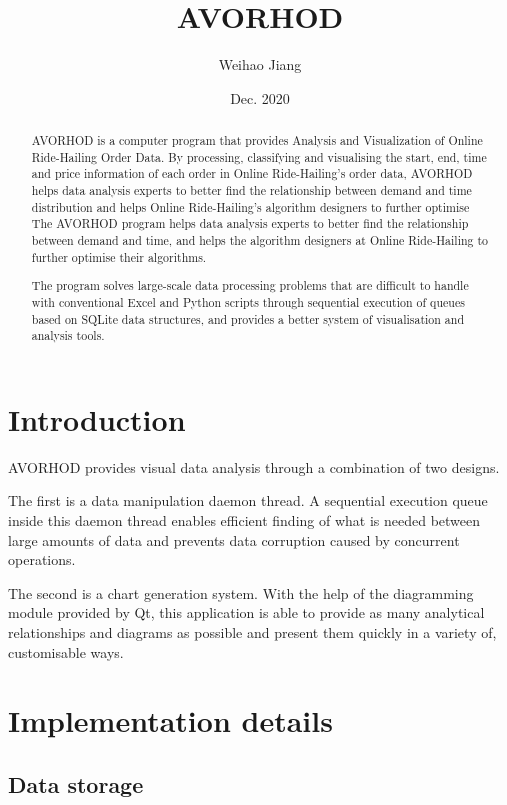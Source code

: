 \documentclass[
]{article}
\author{Weihao Jiang}
\date{Dec. 2020}
\begin{document}
\title{AVORHOD}
\maketitle

\begin{abstract}

AVORHOD is a computer program that provides Analysis and Visualization
of Online Ride-Hailing Order Data. By processing, classifying and
visualising the start, end, time and price information of each order in
Online Ride-Hailing's order data, AVORHOD helps data analysis experts to
better find the relationship between demand and time distribution and
helps Online Ride-Hailing's algorithm designers to further optimise The
AVORHOD program helps data analysis experts to better find the
relationship between demand and time, and helps the algorithm designers
at Online Ride-Hailing to further optimise their algorithms.

The program solves large-scale data processing problems that are
difficult to handle with conventional Excel and Python scripts through
sequential execution of queues based on SQLite data structures, and
provides a better system of visualisation and analysis tools.

\end{abstract}

\section{Introduction}

AVORHOD provides visual data analysis through a combination of two
designs.

The first is a data manipulation daemon thread. A sequential execution
queue inside this daemon thread enables efficient finding of what is
needed between large amounts of data and prevents data corruption caused
by concurrent operations.

The second is a chart generation system. With the help of the
diagramming module provided by Qt, this application is able to provide
as many analytical relationships and diagrams as possible and present
them quickly in a variety of, customisable ways.


\section{Implementation details}

\subsection{Data storage}
\end{document}
